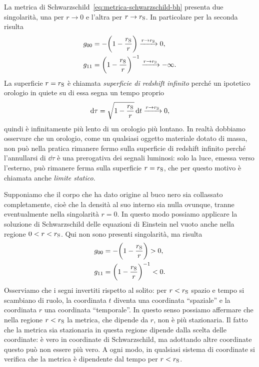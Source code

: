 La metrica di Schwarzschild~\eqref{eq:metrica-schwarzschild-bh} presenta due
singolarità, una per \(r \to 0\) e l'altra per \(r \to r_{\textup{S}}\).  In
particolare per la seconda risulta
\begin{subequations}
  \begin{align}
    g_{00} &= -\biggl(1 - \frac{r_{\textup{S}}}{r}\biggr) \xrightarrow{r\to
             r_{\textup{S}}} 0, \\
    g_{11} &= \biggl(1 - \frac{r_{\textup{S}}}{r}\biggr)^{-1} \xrightarrow{r\to
             r_{\textup{S}}} -\infty.
  \end{align}
\end{subequations}
La superficie \(r = r_{\textup{S}}\) è chiamata \emph{superficie di redshift
  infinito} perché un ipotetico orologio in quiete su di essa segna un tempo
proprio
\begin{equation}
  \mathop{}\!\mathrm{d}\tau = \sqrt{1 - \frac{r_{\textup{S}}}{r}}\mathop{}\!\mathrm{d} t \xrightarrow{r\to
    r_{\textup{S}}} 0,
\end{equation}
quindi è infinitamente più lento di un orologio più lontano.  In realtà dobbiamo
osservare che un orologio, come un qualsiasi oggetto materiale dotato di massa,
non può nella pratica rimanere fermo sulla superficie di redshift infinito
perché l'annullarsi di \(\dd\tau\) è una prerogativa dei segnali luminosi: solo
la luce, emessa verso l'esterno, può rimanere ferma sulla superficie \(r =
r_{\textup{S}}\), che per questo motivo è chiamata anche \emph{limite statico}.

Supponiamo che il corpo che ha dato origine al buco nero sia collassato
completamente, cioè che la densità al suo interno sia nulla ovunque, tranne
eventualmente nella singolarità \(r = 0\).  In questo modo possiamo applicare la
soluzione di Schwarzschild delle equazioni di Einstein nel vuoto anche nella
regione \(0 < r < r_{\textup{S}}\).  Qui non sono presenti singolarità, ma
risulta
\begin{subequations}
  \begin{align}
    g_{00} &= -\biggl(1 - \frac{r_{\textup{S}}}{r}\biggr) > 0, \\
    g_{11} &= \biggl(1 - \frac{r_{\textup{S}}}{r}\biggr)^{-1} < 0.
  \end{align}
\end{subequations}
Osserviamo che i segni invertiti rispetto al solito: per \(r < r_{\textup{S}}\)
spazio e tempo si scambiano di ruolo, la coordinata \(t\) diventa una coordinata
``spaziale'' e la coordinata \(r\) una coordinata ``temporale''.  In questo
senso possiamo affermare che nella regione \(r < r_{\textup{S}}\) la metrica,
che dipende da \(r\), non è più stazionaria.  Il fatto che la metrica sia
stazionaria in questa regione dipende dalla scelta delle coordinate: è vero in
coordinate di Schwarzschild, ma adottando altre coordinate questo può non essere
più vero.  A ogni modo, in qualsiasi sistema di coordinate si verifica che la
metrica è dipendente dal tempo per \(r < r_{\textup{S}}\).

